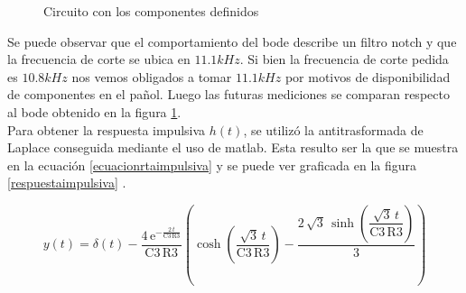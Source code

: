 \begin{figure}[H] 
\begin{center}
\caption{Circuito con los componentes definidos}
\label{fig:bode_ltspice_teorico}
\end{center}
\end{figure}

Se puede observar que el comportamiento del bode describe un filtro notch y que la frecuencia de corte se ubica en $11.1kHz$. Si
bien la frecuencia de corte pedida es $10.8kHz$ nos vemos obligados a tomar $11.1kHz$ por motivos de disponibilidad de componentes
en el pañol. Luego las futuras mediciones se comparan respecto al bode obtenido en la figura \ref{fig:bode_ltspice_teorico}. \\

Para obtener la respuesta impulsiva $h(t)$, se utilizó la antitrasformada de Laplace conseguida mediante el uso de matlab. Esta resulto ser la que se muestra en la ecuación \ref{ecuacionrtaimpulsiva} y se puede ver graficada en la figura \ref{respuestaimpulsiva} .

\begin{equation}
y \! \left(t\right) = \delta \! \left(t\right) - \dfrac{4\, \mathrm{e}^{-\frac{2\, t}{\mathrm{C3}\, \mathrm{R3}}}} {\mathrm{C3}\, \mathrm{R3}} \left(\cosh\!\left(\dfrac{\sqrt{3}\, t}{\mathrm{C3}\, \mathrm{R3}}\right) - \dfrac{2\, \sqrt{3}\, \sinh\!\left(\dfrac{\sqrt{3}\, t}{\mathrm{C3}\, \mathrm{R3}}\right)}{3}\right)
\label{ecuacionrtaimpulsiva}
\end{equation}

